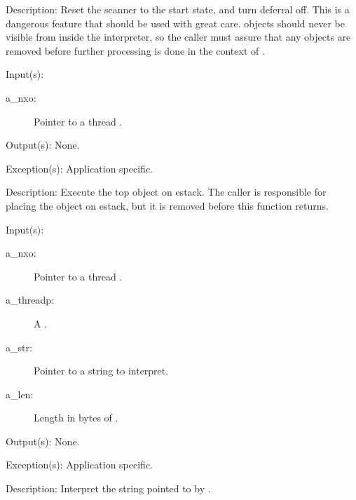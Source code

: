 \begin{capi}
\begin{capilist}
	\item[Description: ]
		Reset the scanner to the start state, and turn deferral off.
		This is a dangerous feature that should be used with great
		care.   objects should never be visible from
		inside the interpreter, so the caller must assure that any
		 objects are removed before further
		processing is done in the context of .
	\end{capilist}
\label{nxo_thread_loop}
	\begin{capilist}
	\item[Input(s): ]
		\begin{description}\item[]
		\item[a\_nxo: ]
			Pointer to a thread .
		\end{description}
	\item[Output(s): ] None.
	\item[Exception(s): ] Application specific.
	\item[Description: ]
		Execute the top object on estack.  The caller is responsible
		for placing the object on estack, but it is removed before this
		function returns.
	\end{capilist}
\label{nxo_thread_interpret}
	\begin{capilist}
	\item[Input(s): ]
		\begin{description}\item[]
		\item[a\_nxo: ]
			Pointer to a thread \classname{nxo}.
		\item[a\_threadp: ]
			A \classname{threadp}.
		\item[a\_str: ]
			Pointer to a string to interpret.
		\item[a\_len: ]
			Length in bytes of \cvar{a\_str}.
		\end{description}
	\item[Output(s): ] None.
	\item[Exception(s): ] Application specific.
	\item[Description: ]
		Interpret the string pointed to by \cvar{a\_str}.
	\end{capilist}

\end{capi}

